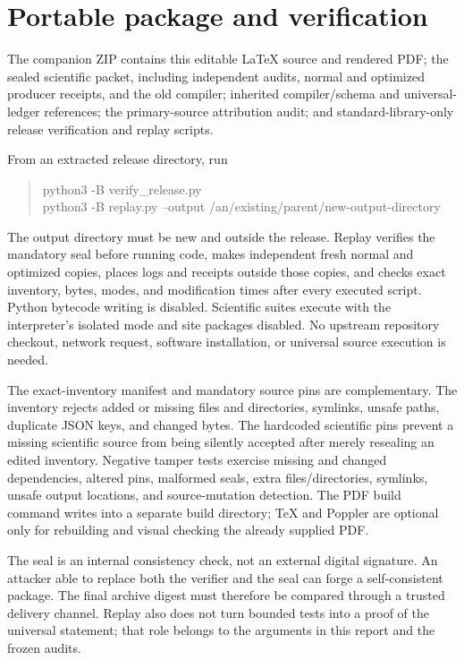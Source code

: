\documentclass[11pt,a4paper]{article}
\numberwithin{equation}{section}
\begin{document}
\section{Portable package and verification}\label{fpa:pi:sec:package}
The companion ZIP contains this editable LaTeX source and rendered PDF; the sealed scientific packet, including independent audits, normal and optimized producer receipts, and the old compiler; inherited compiler/schema and universal-ledger references; the primary-source attribution audit; and standard-library-only release verification and replay scripts.

From an extracted release directory, run
\begin{quote}\small\ttfamily
python3 -B verify\_release.py\\
python3 -B replay.py --output /an/existing/parent/new-output-directory
\end{quote}
The output directory must be new and outside the release. Replay verifies the mandatory seal before running code, makes independent fresh normal and optimized copies, places logs and receipts outside those copies, and checks exact inventory, bytes, modes, and modification times after every executed script. Python bytecode writing is disabled. Scientific suites execute with the interpreter's isolated mode and site packages disabled. No upstream repository checkout, network request, software installation, or universal source execution is needed.

The exact-inventory manifest and mandatory source pins are complementary. The inventory rejects added or missing files and directories, symlinks, unsafe paths, duplicate JSON keys, and changed bytes. The hardcoded scientific pins prevent a missing scientific source from being silently accepted after merely resealing an edited inventory. Negative tamper tests exercise missing and changed dependencies, altered pins, malformed seals, extra files/directories, symlinks, unsafe output locations, and source-mutation detection. The PDF build command writes into a separate build directory; TeX and Poppler are optional only for rebuilding and visual checking the already supplied PDF.

The seal is an internal consistency check, not an external digital signature. An attacker able to replace both the verifier and the seal can forge a self-consistent package. The final archive digest must therefore be compared through a trusted delivery channel. Replay also does not turn bounded tests into a proof of the universal statement; that role belongs to the arguments in this report and the frozen audits.
\end{document}
